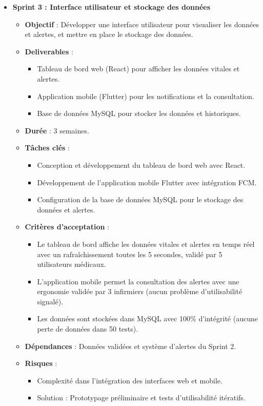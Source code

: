 \begin{itemize}
    \item \textbf{Sprint 3 : Interface utilisateur et stockage des données}
    \begin{itemize}
        \item \textbf{Objectif} : Développer une interface utilisateur pour visualiser les données et alertes, et mettre en place le stockage des données.
        \item \textbf{Deliverables} :
            \begin{itemize}
                \item Tableau de bord web (React) pour afficher les données vitales et alertes.
                \item Application mobile (Flutter) pour les notifications et la consultation.
                \item Base de données MySQL pour stocker les données et historiques.
            \end{itemize}
        \item \textbf{Durée} : 3 semaines.
        \item \textbf{Tâches clés} :
            \begin{itemize}
                \item Conception et développement du tableau de bord web avec React.
                \item Développement de l'application mobile Flutter avec intégration FCM.
                \item Configuration de la base de données MySQL pour le stockage des données et alertes.
            \end{itemize}
        \item \textbf{Critères d'acceptation} :
            \begin{itemize}
                \item Le tableau de bord affiche les données vitales et alertes en temps réel avec un rafraîchissement toutes les 5 secondes, validé par 5 utilisateurs médicaux.
                \item L'application mobile permet la consultation des alertes avec une ergonomie validée par 3 infirmiers (aucun problème d'utilisabilité signalé).
                \item Les données sont stockées dans MySQL avec 100\% d'intégrité (aucune perte de données dans 50 tests).
            \end{itemize}
        \item \textbf{Dépendances} : Données validées et système d'alertes du Sprint 2.
        \item \textbf{Risques} :
            \begin{itemize}
                \item Complexité dans l'intégration des interfaces web et mobile.
                \item Solution : Prototypage préliminaire et tests d'utilisabilité itératifs.
            \end{itemize}
    \end{itemize}
\end{itemize}